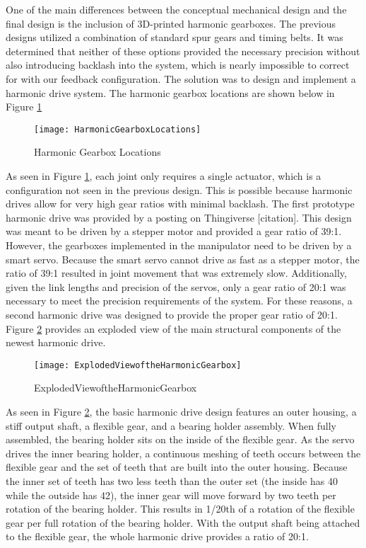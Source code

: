 One of the main differences between the conceptual mechanical design and the final design is the inclusion of 3D-printed harmonic gearboxes. The previous designs utilized a combination of standard spur gears and timing belts. It was determined that neither of these options provided the necessary precision without also introducing backlash into the system, which is nearly impossible to correct for with our feedback configuration. The solution was to design and implement a harmonic drive system. The harmonic gearbox locations are shown below in Figure \ref{fig:HarmonicGearboxLocations}

\begin{figure}[htp]
  \centering
  \texttt{[image: HarmonicGearboxLocations]}
  \caption{Harmonic Gearbox Locations}
  \label{fig:HarmonicGearboxLocations}
\end{figure}

As seen in Figure \ref{fig:HarmonicGearboxLocations}, each joint only requires a single actuator, which is a configuration not seen in the previous design. This is possible because harmonic drives allow for very high gear ratios with minimal backlash. The first prototype harmonic drive was provided by a posting on Thingiverse [citation]. This design was meant to be driven by a stepper motor and provided a gear ratio of 39:1. However, the gearboxes implemented in the manipulator need to be driven by a smart servo. Because the smart servo cannot drive as fast as a stepper motor, the ratio of 39:1 resulted in joint movement that was extremely slow. Additionally, given the link lengths and precision of the servos, only a gear ratio of 20:1 was necessary to meet the precision requirements of the system. For these reasons, a second harmonic drive was designed to provide the proper gear ratio of 20:1. Figure \ref{fig:ExplodedViewoftheHarmonicGearbox} provides an exploded view of the main structural components of the newest harmonic drive.

\begin{figure}[htp]
  \centering
  \texttt{[image: ExplodedViewoftheHarmonicGearbox]}
  \caption{ExplodedViewoftheHarmonicGearbox}
  \label{fig:ExplodedViewoftheHarmonicGearbox}
\end{figure}

As seen in Figure \ref{fig:ExplodedViewoftheHarmonicGearbox}, the basic harmonic drive design features an outer housing, a stiff output shaft, a flexible gear, and a bearing holder assembly. When fully assembled, the bearing holder sits on the inside of the flexible gear. As the servo drives the inner bearing holder, a continuous meshing of teeth occurs between the flexible gear and the set of teeth that are built into the outer housing. Because the inner set of teeth has two less teeth than the outer set (the inside has 40 while the outside has 42), the inner gear will move forward by two teeth per rotation of the bearing holder. This results in 1/20th of a rotation of the flexible gear per full rotation of the bearing holder. With the output shaft being attached to the flexible gear, the whole harmonic drive provides a ratio of 20:1.
